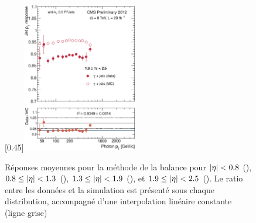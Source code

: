 \begin{figure}[p]
    \subcaptionbox{\label{fig:bal_eta1925}}[0.45\textwidth]{\includegraphics[width=0.45\textwidth]{chapitre4/figs/resp_balancing/response_eta1925_balancing.eps}}
    \caption{Réponses moyennes pour la méthode de la balance pour $\lvert \eta \rvert < \num{0.8}$ (), $\num{0.8} \leq \lvert \eta \rvert < \num{1.3}$ (), $\num{1.3} \leq \lvert \eta \rvert < \num{1.9}$ (), et $\num{1.9} \leq \lvert \eta \rvert < \num{2.5}$ (). Le ratio entre les données et la simulation est présenté sous chaque distribution, accompagné d'une interpolation linéaire constante (ligne grise)}
    \label{fig:balancing_resp}
\end{figure}

